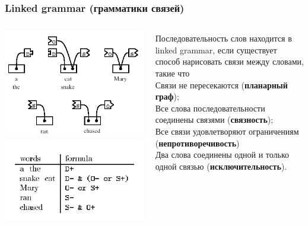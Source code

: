 \documentclass[10pt]{beamer}
\begin{document}
\begin{frame}
  \frametitle{Linked grammar (грамматики связей)}
  \begin{columns}
    \begin{column}{0.4\textwidth}
      \includegraphics[width=0.9\linewidth]{pics/l-g-parts.png}
      \includegraphics[width=0.9\linewidth]{pics/l-g-table.png}
    \end{column}
    \begin{column}{0.6\textwidth}
      Последовательность слов находится в linked grammar, если существует способ нарисовать связи между словами, такие что\\[1em]

      Связи не пересекаются (\textbf{планарный граф});\\[0.5em]
      Все слова последовательности соединены связями (\textbf{связность});\\[0.5em]
      Все связи удовлетворяют ограничениям (\textbf{непротиворечивость})\\[0.5em]
      Два слова соединены одной и только одной связью (\textbf{исключительность}).\\[0.5em]
    \end{column}
  \end{columns}
\end{frame}
\end{document}
